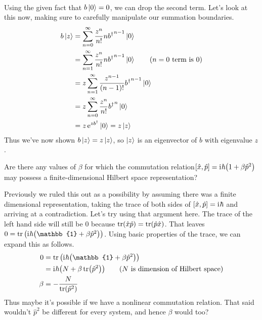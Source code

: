 \documentclass[boxes,pages]{homework}
\makeatletter
\newcommand{\iu}{\mathrm{i}\mkern1mu}
\newcommand{\herm}[1]{{{#1}^\dagger}}
\newcommand{\e}{\mathrm{e}}
\numberwithin{@problem}{section}
\makeatother
\begin{document}
\begin{solution}
\begin{align*}
	\end{align*}
	Using the given fact that $b\ket{0} = 0$, we can drop the second term. Let's look at this now, making sure to carefully manipulate our summation boundaries.
	\begin{align*}
		b\ket{z} & = \sum_{n=0}^\infty\frac{z^n}{n!}n\herm{b}^{n - 1}\ket{0}                       \\
		         & = \sum_{n=1}^\infty\frac{z^n}{n!}n\herm{b}^{n - 1}\ket{0} \tag{$n=0$ term is 0} \\
		         & = z\sum_{n=1}^\infty\frac{z^{n - 1}}{(n - 1)!}\herm{b}^{n - 1}\ket{0}           \\
		         & = z\sum_{n=0}^\infty\frac{z^n}{n!}\herm{b}^n\ket{0}                             \\
		         & = z\,\e^{z\herm{b}}\ket{0} = z\ket{z}
	\end{align*}
	Thus we've now shown $b\ket{z} = z\ket{z}$, so $\ket{z}$ is an eigenvector of $b$ with eigenvalue $z$.
\end{solution}

\setcounter{section}{4}

\begin{problem}
Are there any values of $\beta$ for which the commutation relation$\comm{\hat{x}}{\hat{p}} = \iu\hbar\qty(1 + \beta\hat{p}^2)$ may possess a finite-dimensional Hilbert space representation?
\end{problem}

\begin{solution}
	Previously we ruled this out as a possibility by assuming there was a finite dimensional representation, taking the trace of both sides of $\comm{\hat{x}}{\hat{p}} = \iu\hbar$ and arriving at a contradiction. Let's try using that argument here. The trace of the left hand side will still be 0 because $\tr(\hat{x}\hat{p}) = \tr(\hat{p}\hat{x})$. That leaves $0 = \tr\qty(\iu\hbar\qty(\mathbb{1} + \beta\hat{p}^2))$. Using basic properties of the trace, we can expand this as follows.
	\begin{align*}
		0     & = \tr\qty(\iu\hbar\qty(\mathbb{1} + \beta\hat{p}^2))                            \\
		      & = \iu\hbar\qty(N + \beta\tr(\hat{p}^2)) \tag{$N$ is dimension of Hilbert space} \\
		\beta & = -\frac{N}{\tr(\hat{p}^2)}
	\end{align*}
	Thus maybe it's possible if we have a nonlinear commutation relation. That said wouldn't $\hat{p}^2$ be different for every system, and hence $\beta$ would too?
\end{solution}
\end{document}
